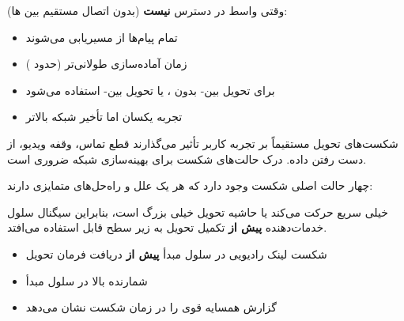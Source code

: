 
وقتی واسط  در دسترس \textbf{نیست} (بدون اتصال مستقیم بین ها):

\begin{itemize}
\tightlist
\item
  تمام پیام‌ها از  مسیریابی می‌شوند
\item
  زمان آماده‌سازی طولانی‌تر (حدود )
\item
  برای تحویل بین- بدون ، یا تحویل بین- استفاده می‌شود
\item
  تجربه  یکسان اما تأخیر شبکه بالاتر
\end{itemize}



\CNchained{}

شکست‌های تحویل مستقیماً بر تجربه کاربر تأثیر می‌گذارند  قطع تماس، وقفه ویدیو، از دست رفتن داده. درک حالت‌های شکست برای بهینه‌سازی شبکه ضروری است.


چهار حالت اصلی شکست وجود دارد که هر یک علل و راه‌حل‌های متمایزی دارند:



\CNchained{}

 خیلی سریع حرکت می‌کند یا حاشیه تحویل خیلی بزرگ است، بنابراین سیگنال سلول خدمات‌دهنده \textbf{پیش از} تکمیل تحویل به زیر سطح قابل استفاده می‌افتد.





\begin{itemize}
\tightlist
\item
  شکست لینک رادیویی  در سلول مبدأ \textbf{پیش از} دریافت فرمان تحویل
\item
  شمارنده  بالا در سلول مبدأ
\item
  گزارش  همسایه قوی را در زمان شکست نشان می‌دهد
\end{itemize}

